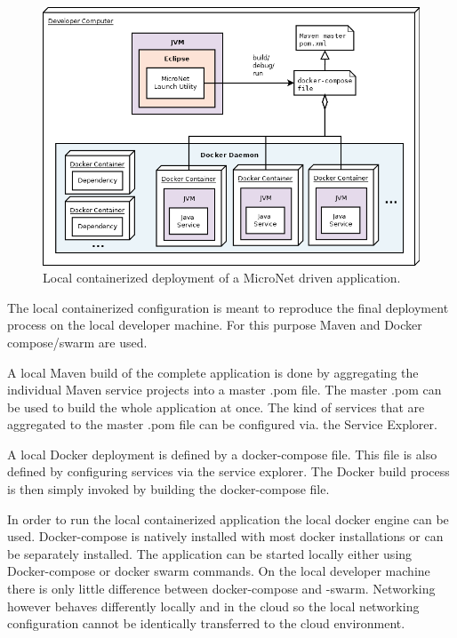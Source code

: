 \begin{figure}
	\centering
	\includegraphics[width=\textwidth]{images/architecture/DeploymentLocalContainerized}
	\caption{Local containerized deployment of a MicroNet driven application.}
	\label{fig:deployment_local_containerized}
\end{figure}

The local containerized configuration is meant to reproduce the final deployment
process on the local developer machine. For this purpose Maven and Docker
compose/swarm are used. 

A local Maven build of the complete application is done by aggregating the
individual Maven service projects into a master .pom file. The master .pom can
be used to build the whole application at once. The kind of services that are
aggregated to the master .pom file can be configured via. the Service Explorer.

A local Docker deployment is defined by a docker-compose file. This file is also
defined by configuring services via the service explorer. The Docker build
process is then simply invoked by building the docker-compose file.

In order to run the local containerized application the local docker engine can
be used. Docker-compose is natively installed with most docker installations or
can be separately installed. The application can be started locally either using
Docker-compose or docker swarm commands. On the local developer machine there is
only little difference between docker-compose and -swarm. Networking however
behaves differently locally and in the cloud so the local networking
configuration cannot be identically transferred to the cloud environment.


